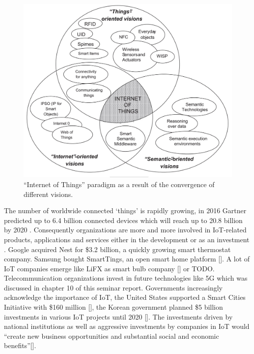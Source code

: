   \begin{figure}[h]
    \begin{center}
    \includegraphics[scale=0.35]{Talk11/iot_visions.jpg}
    \end{center}
    \caption{``Internet of Things'' paradigm as a result of the convergence of different visions.}
    \label{``Internet of Things'' visions}
  \end{figure}

The number of worldwide connected `things' is rapidly growing, in 2016 Gartner predicted up to 6.4 billion connected devices which will reach up to 20.8 billion by 2020 \cite{gartner}. Consequently organizations are more and more involved in IoT-related products, applications and services either in the development or as an investment \cite{ju}. Google acquired Nest for \$3.2 billion, a quickly growing smart thermostat company. Samsung bought SmartTings, an open smart home platform []. A lot of IoT companies emerge like LiFX as smart bulb company [] or TODO. Telecommunication organizations invest in future technologies like 5G which was discussed in chapter 10 of this seminar report. Governments increasingly acknowledge the importance of IoT, the United States supported a Smart Cities Initiative with \$160 million [], the Korean government planned \$5 billion investments in various IoT projects until 2020 []. The investments driven by national institutions as well as aggressive investments by companies in IoT would ``create new business opportunities and substantial social and economic benefits''[]. 

